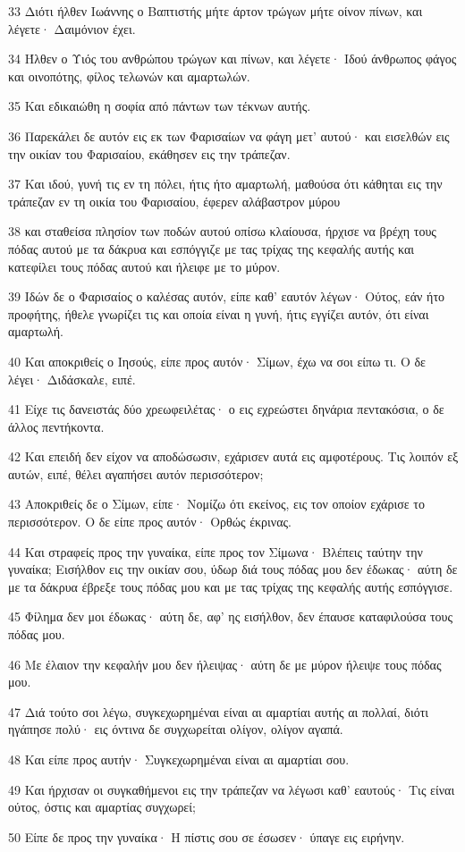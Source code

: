 \par 33 Διότι ήλθεν Ιωάννης ο Βαπτιστής μήτε άρτον τρώγων μήτε οίνον πίνων, και λέγετε· Δαιμόνιον έχει.
\par 34 Ήλθεν ο Υιός του ανθρώπου τρώγων και πίνων, και λέγετε· Ιδού άνθρωπος φάγος και οινοπότης, φίλος τελωνών και αμαρτωλών.
\par 35 Και εδικαιώθη η σοφία από πάντων των τέκνων αυτής.
\par 36 Παρεκάλει δε αυτόν εις εκ των Φαρισαίων να φάγη μετ' αυτού· και εισελθών εις την οικίαν του Φαρισαίου, εκάθησεν εις την τράπεζαν.
\par 37 Και ιδού, γυνή τις εν τη πόλει, ήτις ήτο αμαρτωλή, μαθούσα ότι κάθηται εις την τράπεζαν εν τη οικία του Φαρισαίου, έφερεν αλάβαστρον μύρου
\par 38 και σταθείσα πλησίον των ποδών αυτού οπίσω κλαίουσα, ήρχισε να βρέχη τους πόδας αυτού με τα δάκρυα και εσπόγγιζε με τας τρίχας της κεφαλής αυτής και κατεφίλει τους πόδας αυτού και ήλειφε με το μύρον.
\par 39 Ιδών δε ο Φαρισαίος ο καλέσας αυτόν, είπε καθ' εαυτόν λέγων· Ούτος, εάν ήτο προφήτης, ήθελε γνωρίζει τις και οποία είναι η γυνή, ήτις εγγίζει αυτόν, ότι είναι αμαρτωλή.
\par 40 Και αποκριθείς ο Ιησούς, είπε προς αυτόν· Σίμων, έχω να σοι είπω τι. Ο δε λέγει· Διδάσκαλε, ειπέ.
\par 41 Είχε τις δανειστάς δύο χρεωφειλέτας· ο εις εχρεώστει δηνάρια πεντακόσια, ο δε άλλος πεντήκοντα.
\par 42 Και επειδή δεν είχον να αποδώσωσιν, εχάρισεν αυτά εις αμφοτέρους. Τις λοιπόν εξ αυτών, ειπέ, θέλει αγαπήσει αυτόν περισσότερον;
\par 43 Αποκριθείς δε ο Σίμων, είπε· Νομίζω ότι εκείνος, εις τον οποίον εχάρισε το περισσότερον. Ο δε είπε προς αυτόν· Ορθώς έκρινας.
\par 44 Και στραφείς προς την γυναίκα, είπε προς τον Σίμωνα· Βλέπεις ταύτην την γυναίκα; Εισήλθον εις την οικίαν σου, ύδωρ διά τους πόδας μου δεν έδωκας· αύτη δε με τα δάκρυα έβρεξε τους πόδας μου και με τας τρίχας της κεφαλής αυτής εσπόγγισε.
\par 45 Φίλημα δεν μοι έδωκας· αύτη δε, αφ' ης εισήλθον, δεν έπαυσε καταφιλούσα τους πόδας μου.
\par 46 Με έλαιον την κεφαλήν μου δεν ήλειψας· αύτη δε με μύρον ήλειψε τους πόδας μου.
\par 47 Διά τούτο σοι λέγω, συγκεχωρημέναι είναι αι αμαρτίαι αυτής αι πολλαί, διότι ηγάπησε πολύ· εις όντινα δε συγχωρείται ολίγον, ολίγον αγαπά.
\par 48 Και είπε προς αυτήν· Συγκεχωρημέναι είναι αι αμαρτίαι σου.
\par 49 Και ήρχισαν οι συγκαθήμενοι εις την τράπεζαν να λέγωσι καθ' εαυτούς· Τις είναι ούτος, όστις και αμαρτίας συγχωρεί;
\par 50 Είπε δε προς την γυναίκα· Η πίστις σου σε έσωσεν· ύπαγε εις ειρήνην.

